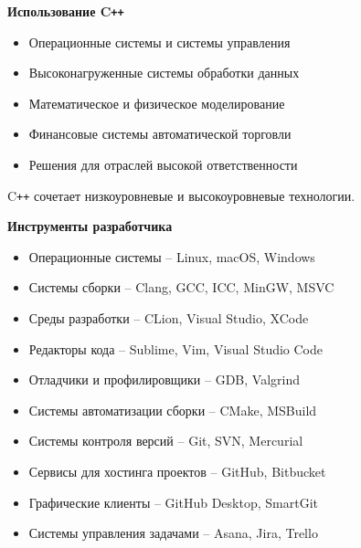 \documentclass{beamer} %
\begin{document}
\begin{frame}{\bf Использование C\texttt{++}}
    
    \begin{itemize}

        \item Операционные системы и системы управления

        \item Высоконагруженные системы обработки данных

        \item Математическое и физическое моделирование

        \item Финансовые системы автоматической торговли

        \item Решения для отраслей высокой ответственности
        
    \end{itemize}

    \begin{block}
    \justifying C\texttt{++} сочетает низкоуровневые и высокоуровневые технологии.
    \end{block}
    
\end{frame}

\begin{frame}{\bf Инструменты разработчика}

    \begin{itemize}

        \item Операционные системы -- Linux, macOS, Windows

        \item Системы сборки -- Clang, GCC, ICC, MinGW, MSVC

        \item Среды разработки -- CLion, Visual Studio, XCode

        \item Редакторы кода -- Sublime, Vim, Visual Studio Code

        \item Отладчики и профилировщики -- GDB, Valgrind

        \item Системы автоматизации сборки -- CMake, MSBuild

        \item Системы контроля версий -- Git, SVN, Mercurial

        \item Сервисы для хостинга проектов -- GitHub, Bitbucket

        \item Графические клиенты -- GitHub Desktop, SmartGit

        \item Системы управления задачами -- Asana, Jira, Trello

    \end{itemize}
    
\end{frame}
\end{document}
